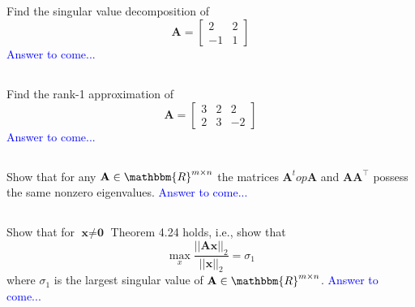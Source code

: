 \documentclass[a4paper,12pt]{article}
\newcommand{\R}{\mathbbm{R}}
\newcommand{\M}[1]{ \begin{bmatrix} #1 \end{bmatrix} }
\newcommand{\vecx}{\textbf{x}}
\newcommand{\veco}{\textbf{0}}
\newcommand{\matA}{\textbf{A}}
\begin{document}
\subsection{}
Find the singular value decomposition of 
$$\matA = \M{2&2\\-1&1}$$
\textcolor{blue}{
Answer to come...
}
\subsection{}
Find the rank-1 approximation of 
$$\matA = \M{3&2&2\\2&3&-2}$$
\textcolor{blue}{
Answer to come...
}
\subsection{}
Show that for any $\matA \in \R^{m \times n}$ the matrices $\matA^top \matA$ and $\matA \matA^\top$ possess the same nonzero eigenvalues.
\textcolor{blue}{
Answer to come...
}
\subsection{}
Show that for $\vecx \neq \veco$ Theorem 4.24 holds, i.e., show that 
$$\max\limits_x \dfrac{||\matA \vecx ||_2}{||\vecx||_2} = \sigma_1$$
where $\sigma_1$ is the largest singular value of $\matA \in \R^{m \times n}$.
\textcolor{blue}{
Answer to come...
}
\newpage%
\end{document}
